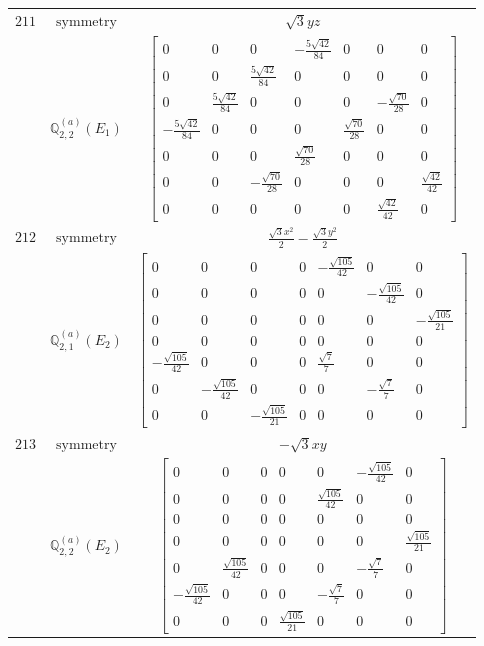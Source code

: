 \documentclass[fleqn,8pt,landscape]{jsarticle}
\begin{document}
\begin{longtable}{ccc}
$ 211 $ & $ \text{symmetry} $ & $ \sqrt{3} y z $ \\
$  $ & $ \mathbb{Q}_{2,2}^{(a)}(E_{1}) $ & $ \begin{bmatrix} 0 & 0 & 0 & - \frac{5 \sqrt{42}}{84} & 0 & 0 & 0 \\ 0 & 0 & \frac{5 \sqrt{42}}{84} & 0 & 0 & 0 & 0 \\ 0 & \frac{5 \sqrt{42}}{84} & 0 & 0 & 0 & - \frac{\sqrt{70}}{28} & 0 \\ - \frac{5 \sqrt{42}}{84} & 0 & 0 & 0 & \frac{\sqrt{70}}{28} & 0 & 0 \\ 0 & 0 & 0 & \frac{\sqrt{70}}{28} & 0 & 0 & 0 \\ 0 & 0 & - \frac{\sqrt{70}}{28} & 0 & 0 & 0 & \frac{\sqrt{42}}{42} \\ 0 & 0 & 0 & 0 & 0 & \frac{\sqrt{42}}{42} & 0 \end{bmatrix} $ \\ \hline
$ 212 $ & $ \text{symmetry} $ & $ \frac{\sqrt{3} x^{2}}{2} - \frac{\sqrt{3} y^{2}}{2} $ \\
$  $ & $ \mathbb{Q}_{2,1}^{(a)}(E_{2}) $ & $ \begin{bmatrix} 0 & 0 & 0 & 0 & - \frac{\sqrt{105}}{42} & 0 & 0 \\ 0 & 0 & 0 & 0 & 0 & - \frac{\sqrt{105}}{42} & 0 \\ 0 & 0 & 0 & 0 & 0 & 0 & - \frac{\sqrt{105}}{21} \\ 0 & 0 & 0 & 0 & 0 & 0 & 0 \\ - \frac{\sqrt{105}}{42} & 0 & 0 & 0 & \frac{\sqrt{7}}{7} & 0 & 0 \\ 0 & - \frac{\sqrt{105}}{42} & 0 & 0 & 0 & - \frac{\sqrt{7}}{7} & 0 \\ 0 & 0 & - \frac{\sqrt{105}}{21} & 0 & 0 & 0 & 0 \end{bmatrix} $ \\ \hline
$ 213 $ & $ \text{symmetry} $ & $ - \sqrt{3} x y $ \\
$  $ & $ \mathbb{Q}_{2,2}^{(a)}(E_{2}) $ & $ \begin{bmatrix} 0 & 0 & 0 & 0 & 0 & - \frac{\sqrt{105}}{42} & 0 \\ 0 & 0 & 0 & 0 & \frac{\sqrt{105}}{42} & 0 & 0 \\ 0 & 0 & 0 & 0 & 0 & 0 & 0 \\ 0 & 0 & 0 & 0 & 0 & 0 & \frac{\sqrt{105}}{21} \\ 0 & \frac{\sqrt{105}}{42} & 0 & 0 & 0 & - \frac{\sqrt{7}}{7} & 0 \\ - \frac{\sqrt{105}}{42} & 0 & 0 & 0 & - \frac{\sqrt{7}}{7} & 0 & 0 \\ 0 & 0 & 0 & \frac{\sqrt{105}}{21} & 0 & 0 & 0 \end{bmatrix} $ \\ \hline

\end{longtable}
\end{document}
